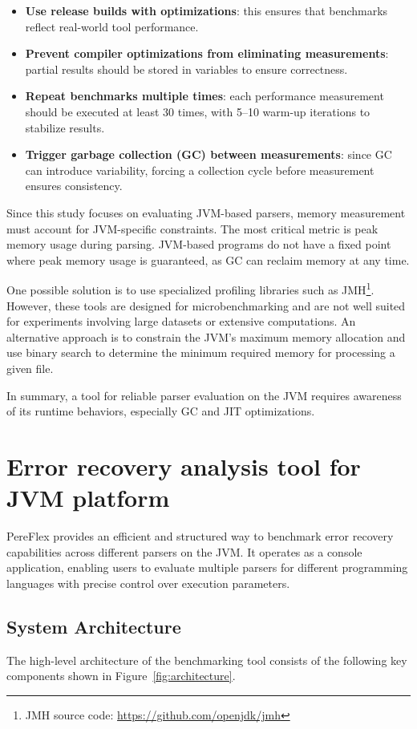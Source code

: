 \documentclass[conference]{IEEEtran}
\begin{document}
\begin{itemize}
    \item \textbf{Use release builds with optimizations}: this ensures that benchmarks reflect real-world tool performance.
    \item \textbf{Prevent compiler optimizations from eliminating measurements}: partial results should be stored in variables to ensure correctness.
    \item \textbf{Repeat benchmarks multiple times}: each performance measurement should be executed at least 30 times, with 5–10 warm-up iterations to stabilize results.
    \item \textbf{Trigger garbage collection (GC) between measurements}: since GC can introduce variability, forcing a collection cycle before measurement ensures consistency.
\end{itemize}

Since this study focuses on evaluating JVM-based parsers, memory measurement must account for JVM-specific constraints. The most critical metric is peak memory usage during parsing. JVM-based programs do not have a fixed point where peak memory usage is guaranteed, as GC can reclaim memory at any time.



One possible solution is to use specialized profiling libraries such as JMH\footnote{JMH source code: \url{https://github.com/openjdk/jmh}}. However, these tools are designed for microbenchmarking and are not well suited for experiments involving large datasets or extensive computations. An alternative approach is to constrain the JVM's maximum memory allocation and use binary search to determine the minimum required memory for processing a given file.

In summary, a tool for reliable parser evaluation on the JVM requires awareness of its runtime behaviors, especially GC and JIT optimizations. 


\section{Error recovery analysis tool for JVM platform}
PereFlex provides an efficient and structured way to benchmark error recovery capabilities across different parsers on the JVM.\@
It operates as a console application, enabling users to evaluate multiple parsers for different programming languages with precise control over execution parameters.

\subsection{System Architecture}
The high-level architecture of the benchmarking tool consists of the following key components shown in Figure~\ref{fig:architecture}.
\end{document}
